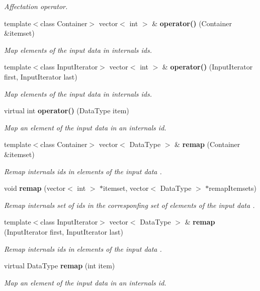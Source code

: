 \begin{CompactItemize}
\begin{CompactList}\small\item\em Affectation operator. \item\end{CompactList}\item 
template$<$class Container$>$ vector$<$ int $>$ \& {\bf operator()} (Container \&itemset)
\begin{CompactList}\small\item\em Map elements of the input data in internals ids. \item\end{CompactList}\item 
template$<$class Input\-Iterator$>$ vector$<$ int $>$ \& {\bf operator()} (Input\-Iterator first, Input\-Iterator last)
\begin{CompactList}\small\item\em Map elements of the input data in internals ids. \item\end{CompactList}\item 
virtual int {\bf operator()} (Data\-Type item)
\begin{CompactList}\small\item\em Map an element of the input data in an internals id. \item\end{CompactList}\item 
template$<$class Container$>$ vector$<$ Data\-Type $>$ \& {\bf remap} (Container \&itemset)
\begin{CompactList}\small\item\em Remap internals ids in elements of the input data . \item\end{CompactList}\item 
void {\bf remap} (vector$<$ int $>$ $\ast$itemset, vector$<$ Data\-Type $>$ $\ast$remap\-Itemsets)
\begin{CompactList}\small\item\em Remap internals set of ids in the corresponfing set of elements of the input data . \item\end{CompactList}\item 
template$<$class Input\-Iterator$>$ vector$<$ Data\-Type $>$ \& {\bf remap} (Input\-Iterator first, Input\-Iterator last)
\begin{CompactList}\small\item\em Remap internals ids in elements of the input data . \item\end{CompactList}\item 
virtual Data\-Type {\bf remap} (int item)
\begin{CompactList}\small\item\em Map an element of the input data in an internals id. \item\end{CompactList}\end{CompactItemize}
